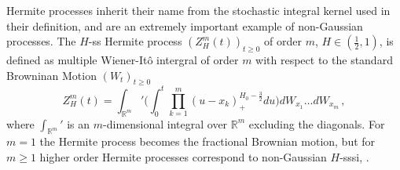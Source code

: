 \documentclass[a4paper]{article}
\newcommand{\Real}{\mathbb{R}}
\begin{document}
Hermite processes inherit their name from the stochastic integral kernel used in
their definition, and are an extremely important example of non-Gaussian processes.
The $H$-ss Hermite process $(Z_H^m(t))_{t\geq 0}$ of order $m$, $H \in (\tfrac{1}{2}, 1)$,
is defined as multiple Wiener-It\^o intergral of order $m$ with respect to the 
standard Browninan Motion $(W_t)_{t\geq0}$
\begin{equation}\label{eq:def_hermite}
    Z_H^m(t) = \int_{\Real^m}' \Biggl(
            \int_0^t \prod_{k=1}^m (u - x_k)_+^{H_0-\frac{3}{2}} du
        \Biggr) dW_{x_1} \ldots dW_{x_m}\,,
\end{equation}
where $\int_{\Real^m}'$ is an $m$-dimensional integral over $\Real^m$ excluding the
diagonals. For $m=1$ the Hermite process becomes the fractional Brownian motion,
but for $m\geq 1$ higher order Hermite processes correspond to non-Gaussian $H$-sssi,
\cite{Bai20141710,maejima2007,Chronopoulou:1114288,embrechts2000introduction}.

\end{document}
